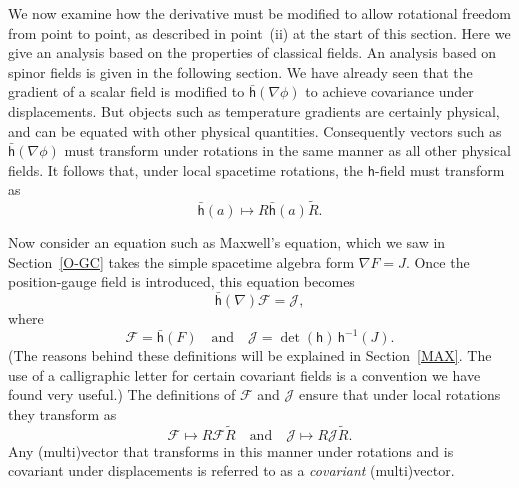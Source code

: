 \documentclass[a4paper]{article}
\numberwithin{equation}{section}
\newcommand{\eqv}{=}
\newcommand{\clf}{{\mathcal{F}}}
\newcommand{\clj}{{\mathcal{J}}}
\newcommand{\Rrev}{\tilde{R}}
\newcommand{\lih}{\mathsf{h}}
\newcommand{\lbh}{\bar{\mathsf{h}}}
\newcommand{\ho}{\lbh}
\newcommand{\hu}{\lih}
\newcommand{\grad}{\nabla}
\renewcommand{\dh}{\det(\hu)}
\begin{document}
We now examine how the derivative must be modified to allow rotational
freedom from point to point, as described in point~(ii) at the start
of this section.  Here we give an analysis based on the properties of
classical fields.  An analysis based on spinor fields is given in the
following section.  We have already seen that the gradient of a scalar
field is modified to $\ho(\grad\phi)$ to achieve covariance under
displacements.  But objects such as temperature gradients are
certainly physical, and can be equated with other physical quantities.
Consequently vectors such as $\ho(\grad\phi)$ must transform under
rotations in the same manner as all other physical fields.  It follows
that, under local spacetime rotations, the $\lih$-field must transform as
%
\begin{equation}
\ho(a) \mapsto R \ho(a) \Rrev .
\end{equation} 
%

Now consider an equation such as Maxwell's equation, which we saw in
Section~\ref{O-GC} takes the simple spacetime algebra form $\grad
F=J$.  Once the position-gauge field is introduced, this equation
becomes
%
\begin{equation}
\ho(\grad)\clf=\clj, 
\label{Gmx1}
\end{equation}
%
where
%
\begin{equation}
\clf \eqv \ho(F) \quad \mbox{and} \quad \clj \eqv \dh \, \hu^{-1} (J).
\end{equation} 
%
(The reasons behind these definitions will be explained in
Section~\ref{MAX}.  The use of a calligraphic letter for certain
covariant fields is a convention we have found very useful.)
The definitions of $\clf$ and $\clj$ ensure that under local rotations
they transform as 
%
\begin{equation}
\clf \mapsto R\clf\Rrev \quad \mbox{and} \quad  \clj \mapsto
R\clj\Rrev.
\end{equation}
%
Any (multi)vector that transforms in this manner under rotations and
is covariant under displacements is referred to as a
\textit{covariant} (multi)vector.  
\end{document}
